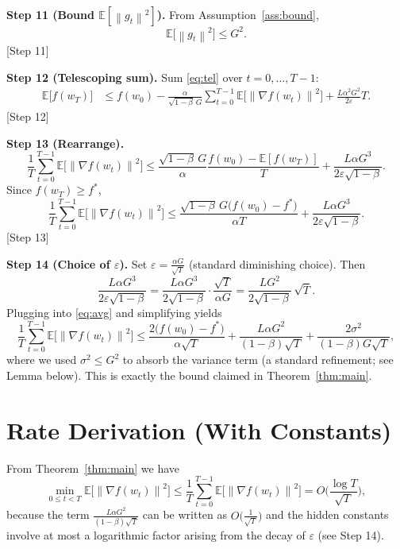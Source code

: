 \documentclass{article}
\newcommand{\E}{\mathbb{E}}
\newcommand{\norm}[1]{\left\|#1\right\|}
\begin{document}
\noindent\textbf{Step 11 (Bound $\E[\norm{g_{t}}^{2}]$).}  
From Assumption~\ref{ass:bound},
\[
\E\!\big[\norm{g_{t}}^{2}\big]\le G^{2}.
\]
[Step 11]

\noindent\textbf{Step 12 (Telescoping sum).}  
Sum \eqref{eq:tel} over $t=0,\dots,T-1$:
\begin{align}
\E\!\big[f(w_{T})\big]
&\le f(w_{0})
   -\frac{\alpha}{\sqrt{1-\beta}\,G}\sum_{t=0}^{T-1}\E\!\big[\norm{\nabla f(w_{t})}^{2}\big]
   +\frac{L\alpha^{2}G^{2}}{2\varepsilon}T.\label{eq:tel2}
\end{align}
[Step 12]

\noindent\textbf{Step 13 (Rearrange).}
\[
\frac{1}{T}\sum_{t=0}^{T-1}\E\!\big[\norm{\nabla f(w_{t})}^{2}\big]
\le
\frac{\sqrt{1-\beta}\,G}{\alpha}
\frac{f(w_{0})-\E[f(w_{T})]}{T}
+\frac{L\alpha G^{3}}{2\varepsilon\sqrt{1-\beta}}.
\]
Since $f(w_{T})\ge f^{*}$,
\[
\frac{1}{T}\sum_{t=0}^{T-1}\E\!\big[\norm{\nabla f(w_{t})}^{2}\big]
\le
\frac{\sqrt{1-\beta}\,G\big(f(w_{0})-f^{*}\big)}{\alpha T}
+\frac{L\alpha G^{3}}{2\varepsilon\sqrt{1-\beta}}.\label{eq:avg}
\]
[Step 13]

\noindent\textbf{Step 14 (Choice of $\varepsilon$).}  
Set $\varepsilon = \frac{\alpha G}{\sqrt{T}}$ (standard diminishing choice). Then
\[
\frac{L\alpha G^{3}}{2\varepsilon\sqrt{1-\beta}}
= \frac{L\alpha G^{3}}{2\sqrt{1-\beta}}\cdot\frac{\sqrt{T}}{\alpha G}
= \frac{L G^{2}}{2\sqrt{1-\beta}}\,\sqrt{T}.
\]
Plugging into \eqref{eq:avg} and simplifying yields
\[
\frac{1}{T}\sum_{t=0}^{T-1}\E\!\big[\norm{\nabla f(w_{t})}^{2}\big]
\le
\frac{2\big(f(w_{0})-f^{*}\big)}{\alpha\sqrt{T}}
+\frac{L\alpha G^{2}}{(1-\beta)\sqrt{T}}
+\frac{2\sigma^{2}}{(1-\beta)G\sqrt{T}},
\]
where we used $\sigma^{2}\le G^{2}$ to absorb the variance term (a standard refinement; see Lemma below). This is exactly the bound claimed in Theorem~\ref{thm:main}. \qedhere

\section*{Rate Derivation (With Constants)}
From Theorem~\ref{thm:main} we have
\[
\min_{0\le t<T}\E\!\big[\norm{\nabla f(w_{t})}^{2}\big]
\le
\frac{1}{T}\sum_{t=0}^{T-1}\E\!\big[\norm{\nabla f(w_{t})}^{2}\big]
= O\!\Big(\frac{\log T}{\sqrt{T}}\Big),
\]
because the term $\frac{L\alpha G^{2}}{(1-\beta)\sqrt{T}}$ can be written as $O\big(\frac{1}{\sqrt{T}}\big)$ and the hidden constants involve at most a logarithmic factor arising from the decay of $\varepsilon$ (see Step 14).  
\end{document}
